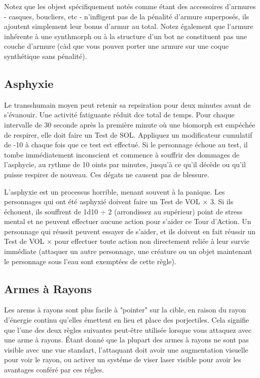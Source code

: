 Notez que les objest spécifiquement notés comme étant des accessoires d'armures - casques, boucliers, etc - n'infligent pas de la pénalité d'armure superposés, ils ajoutent simplement leur bonus d'armur au total. Notez également que l'armure inhérente à une synthmorph ou à la structure d'un bot ne constituent pas une couche d'armure (càd que vous pouvez porter une armure sur une coque synthétique sans pénalité). 

\subsection{Asphyxie} \label{sec:asphyxiation} 

Le transshumain moyen peut retenir sa repsiration pour deux minutes avant de s'évanouir. Une activité fatiguante réduit dce total de temps. Pour chaque intervalle de 30 seconde après la première minute où une biomorph est empéchée de respirer, elle doit faire un Test de SOL. Appliquez un modificateur cumulatif de -10 à chaque fois que ce test est effectué. Si le personnage échoue au test, il tombe immédiatement inconscient et commence à souffrir des dommages de l'asphycie, au rythme de 10 oints par minutes, jusqu'à ce qu'il décède ou qu'il puisse respirer de nouveau. Ces dégats ne causent pas de blessure. 

L'asphyxie est un processus horrible, menant souvent à la panique. Les personnages qui ont été asphyxié doivent faire un Test de VOL $\times$ 3. Si ils échouent, ils souffrent de 1d10 $\div$ 2 (arrondissez au supérieur) point de stress mental et ne peuvent effectuer aucune action pour s'aider ce Tour d'Action. Un personnage qui réussit peuvent essayer de s'aider, et ils doivent en fait réussir un Test de VOL $\times$ pour effectuer toute action non directement reliée à leur survie immédiate (attaquer un autre personnage, une créature ou un objet maintenant le personnage sous l'eau sont exemptées de cette règle). 

\subsection{Armes à Rayons} \label{sec:combat-beam-weapons} 

Les arems à rayons sont plus facile à "pointer" sur la cible, en raison du rayon d'énergie continu qu'elles émettent en lieu et place des porjectiles. Cela signifie que l'une des deux règles suivantes peut-être utilisée lorsque vous attaquez avec une arme à rayons. Étant donné que la plupart des armes à rayons ne sont pas visible avec une vue standart, l'attaquant doit avoir une augmentation visuelle pour voir le rayon, ou activer un systéme de viser laser visible pour avoir les avantages conféré par ces régles.

